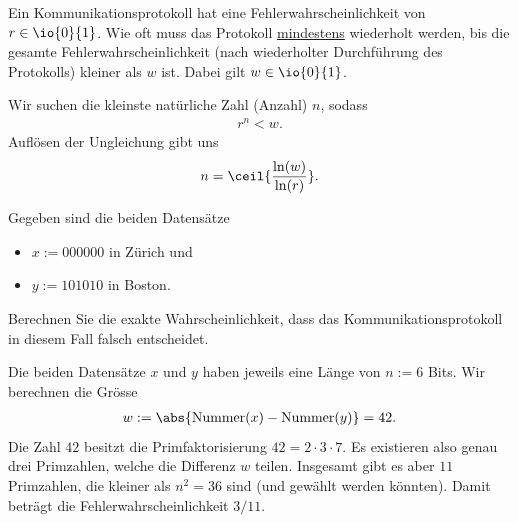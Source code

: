 \begin{questions}
\question[3]

Ein Kommunikationsprotokoll hat eine Fehlerwahrscheinlichkeit von $r\in\io{0}{1}$. Wie oft muss das Protokoll \underline{mindestens} wiederholt werden, bis die gesamte Fehlerwahrscheinlichkeit (nach wiederholter Durchführung des Protokolls) kleiner als $w$ ist. Dabei gilt $w\in\io{0}{1}$. 
\begin{solution}
  Wir suchen die kleinste natürliche Zahl (Anzahl) $n$, sodass
  \begin{align*}
    r^n < w.
  \end{align*}
  Auflösen der Ungleichung gibt uns
  \begin{align*}
    n = \ceil{\frac{\ln(w)}{\ln(r)}}.
  \end{align*}
\end{solution}

\question[3] Gegeben sind die beiden Datensätze
\begin{itemize}
  \item $x := 000000$ in Zürich und
  \item $y := 101010$ in Boston.
\end{itemize}
Berechnen Sie die exakte Wahrscheinlichkeit, dass das Kommunikationsprotokoll in diesem Fall falsch entscheidet.
\begin{solution}
  Die beiden Datensätze $x$ und $y$ haben jeweils eine Länge von $n := 6$ Bits.
  Wir berechnen die Grösse
  \begin{align*}
    w := \abs{\text{Nummer}(x) - \text{Nummer}(y)} = 42.
  \end{align*}
Die Zahl $42$ besitzt die Primfaktorisierung $42 = 2\cdot 3\cdot 7$. Es existieren also genau drei Primzahlen, welche die Differenz $w$ teilen. Insgesamt gibt es aber $11$ Primzahlen, die kleiner als $n^2 = 36$ sind (und gewählt werden könnten). Damit beträgt die Fehlerwahrscheinlichkeit $3/11$.  
\end{solution}


\end{questions}
